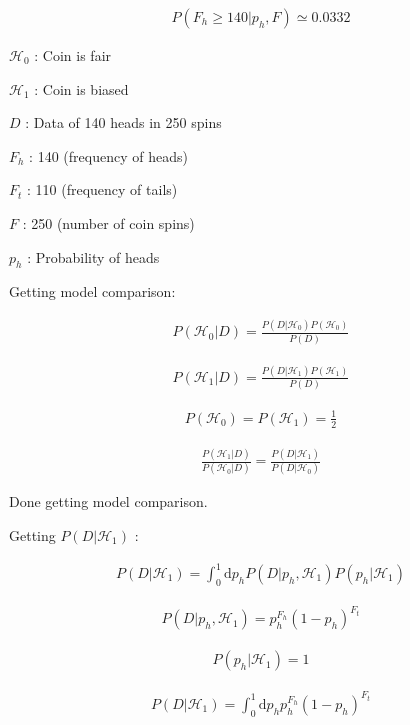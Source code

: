 \documentclass[12pt]{article}
\begin{document}
\begin{gather}
P(F_h \geq 140 | p_h, F) \simeq 0.0332
\end{gather}

$\mathcal{H}_0$ : Coin is fair

$\mathcal{H}_1$ : Coin is biased

$D$ : Data of 140 heads in 250 spins

$F_h$ :  140 (frequency of heads)

$F_t$ :  110 (frequency of tails)

$F$ : 250 (number of coin spins)

$p_h$ : Probability of heads

Getting model comparison:

\begin{gather}
P(\mathcal{H}_0 | D) = \frac{P(D | \mathcal{H}_0)P(\mathcal{H}_0)}{P(D)}
\end{gather}

\begin{gather}
P(\mathcal{H}_1 | D) = \frac{P(D | \mathcal{H}_1)P(\mathcal{H}_1)}{P(D)}
\end{gather}

\begin{gather}
P(\mathcal{H}_0) = P(\mathcal{H}_1) = \frac{1}{2}
\end{gather}

\begin{gather}
\frac{P(\mathcal{H}_1 | D)}{P(\mathcal{H}_0 | D)} = \frac{P(D | \mathcal{H}_1)}{P(D | \mathcal{H}_0)}
\end{gather}

Done getting model comparison.

Getting $P(D|\mathcal{H}_1)$ :

\begin{gather}
P(D|\mathcal{H}_1) = \int_0^1 \! \mathrm{d}p_h P(D|p_h,\mathcal{H}_1)P(p_h|\mathcal{H}_1)
\end{gather}

\begin{gather}
P(D|p_h,\mathcal{H}_1) = p_h^{F_h}(1 - p_h)^{F_t}
\end{gather}

\begin{gather}
P(p_h|\mathcal{H}_1) = 1
\end{gather}

\begin{gather}
P(D|\mathcal{H}_1) = \int_0^1 \! \mathrm{d}p_h p_h^{F_h}(1 - p_h)^{F_t}
\end{gather}
\end{document}
